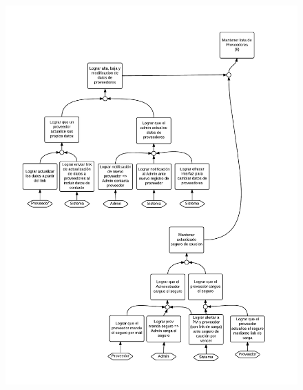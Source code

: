 \begin{figure}[H]
\includegraphics[width=\textwidth, clip=true, trim=15pt 0pt 15pt 0pt]{imagenes/objetivos/objetivos16.pdf}
\end{figure}

